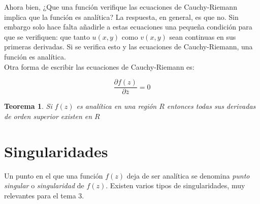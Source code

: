 \documentclass[12pt,a4paper]{book}
\newcommand{\parciales}[2]{\frac{\partial #1}{\partial #2}}
\newtheorem{theorem}{Teorema}[section]
\begin{document}
Ahora bien, ¿Que una función verifique las ecuaciones de Cauchy-Riemann implica  que la función es analítica? La respuesta, en general, es que no. Sin embargo solo hace falta añadirle a estas ecuaciones una pequeña condición para que se verifiquen: que tanto $u(x,y)$ como $v(x,y)$ sean continuas en sus primeras derivadas. Si se verifica esto y las ecuaciones de Cauchy-Riemann, una función es analítica. \\

Otra forma de escribir las ecuaciones de Cauchy-Riemann es:

\begin{equation}
\parciales{f(z)}{\bar{z}}=0
\end{equation}

\begin{theorem}
Si $f(z)$ es analítica en una región $R$ entonces todas sus derivadas de orden superior existen en $R$
\end{theorem}


\section{Singularidades}

Un punto en el que una función $f(z)$ deja de ser analítica se denomina \textit{punto singular} o \textit{singularidad} de $f(z)$. Existen varios tipos de singularidades, muy relevantes para el tema 3.
\end{document}
